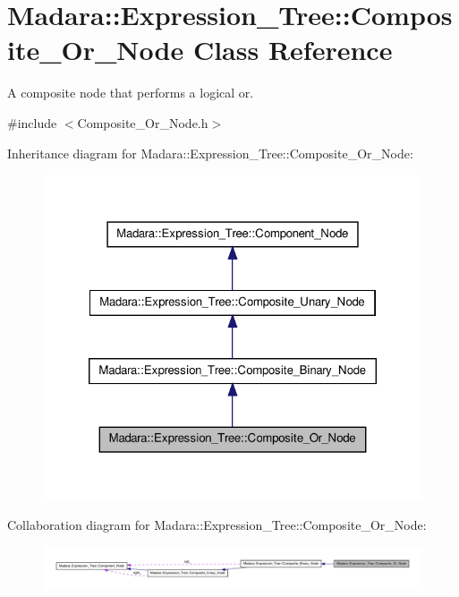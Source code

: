 \hypertarget{classMadara_1_1Expression__Tree_1_1Composite__Or__Node}{
\section{Madara::Expression\_\-Tree::Composite\_\-Or\_\-Node Class Reference}
\label{dc/df9/classMadara_1_1Expression__Tree_1_1Composite__Or__Node}
}


A composite node that performs a logical or.  




{\ttfamily \#include $<$Composite\_\-Or\_\-Node.h$>$}



Inheritance diagram for Madara::Expression\_\-Tree::Composite\_\-Or\_\-Node:
\nopagebreak
\begin{figure}[H]
\begin{center}
\leavevmode
\includegraphics[width=322pt]{d6/df3/classMadara_1_1Expression__Tree_1_1Composite__Or__Node__inherit__graph}
\end{center}
\end{figure}


Collaboration diagram for Madara::Expression\_\-Tree::Composite\_\-Or\_\-Node:
\nopagebreak
\begin{figure}[H]
\begin{center}
\leavevmode
\includegraphics[width=400pt]{d5/ded/classMadara_1_1Expression__Tree_1_1Composite__Or__Node__coll__graph}
\end{center}
\end{figure}
